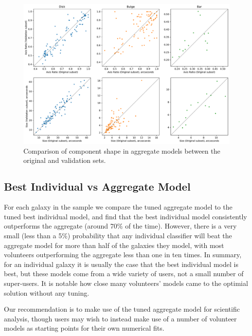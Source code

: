 \documentclass[../main.tex]{subfiles}
\begin{document}
\begin{figure}
  \includegraphics[width=17.3cm]{images__results/component_sizing.pdf}
  \caption{Comparison of component shape in aggregate models between the original and validation sets.}
  \label{fig:aggregate_model_consistency}
\end{figure}

\subsection{Best Individual vs Aggregate Model}

For each galaxy in the sample we compare the tuned aggregate model to the tuned best individual model, and find that the best individual model consistently outperforms the aggregate (around 70\% of the time). However, there is a very small (less than a 5\%) probability that any individual classifier will beat the aggregate model for more than half of the galaxies they model, with most volunteers outperforming the aggregate less than one in ten times. In summary, for an individual galaxy it is usually the case that the best individual model is best, but these models come from a wide variety of users, not a small number of super-users. It is notable how close many volunteers' models came to the optimial solution without any tuning.

Our recommendation is to make use of the tuned aggregate model for scientific analysis, though users may wish to instead make use of a number of volunteer models as starting points for their own numerical fits.
\end{document}
